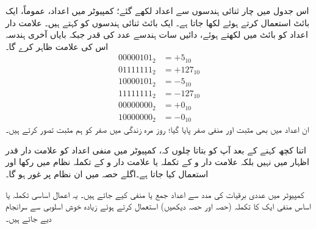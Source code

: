 اس جدول میں چار ثنائی ہندسوں سے اعداد لکھے گئے؛ کمپیوٹر میں اعداد، عموماً، ایک بائٹ استعمال کرتے ہوئے لکھا جاتا ہے۔ ایک بائٹ  ثنائی ہندسوں کو کہتے ہیں۔ علامت دار اعداد کو بائٹ میں لکھتے ہوئے، دائیں سات ہندسے عدد کی قدر جبکہ بایاں آخری ہندسہ اس کی علامت ظاہر کرے گا۔
\begin{align*}
00000101_2&=+5_{10}\\
01111111_2&=+127_{10}\\
10000101_2&=-5_{10}\\
11111111_2&=-127_{10}\\
00000000_2&=+0_{10}\\
10000000_2&=-0_{10}
\end{align*}
ان اعداد میں بھی مثبت اور منفی صفر پایا گیا؛ روز مرہ زندگی میں صفر کو ہم مثبت تصور کرتے ہیں۔

اتنا کچھ کہنے کے بعد آپ کو بتاتا چلوں کہ، کمپیوٹر میں منفی اعداد کو علامت دار قدر اظہار میں نہیں بلکہ علامت دار و  کے تکملہ یا علامت دار و  کے تکملہ نظام میں رکھا اور استعمال کیا جاتا ہے۔اگلے حصہ میں ان نظام پر غور ہو گا۔

کمپیوٹر میں عددی برقیات کی مدد سے اعداد جمع یا منفی کیے جاتے ہیں۔ یہ اعمال اساسی تکملہ یا اساس منفی ایک کا تکملہ (حصہ  اور حصہ  دیکھیں) استعمال کرتے ہوئے زیادہ خوش اسلوبی سے سرانجام دیے جاتے ہیں۔


